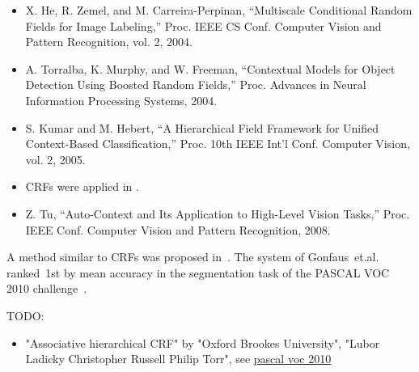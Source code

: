 \begin{itemize}
    \item X. He, R. Zemel, and M. Carreira-Perpinan, “Multiscale Conditional
          Random Fields for Image Labeling,” Proc. IEEE CS Conf. Computer
          Vision and Pattern Recognition, vol. 2, 2004.
    \item A. Torralba, K. Murphy, and W. Freeman, “Contextual Models for
          Object Detection Using Boosted Random Fields,” Proc. Advances in
          Neural Information Processing Systems, 2004.
    \item S. Kumar and M. Hebert, “A Hierarchical Field Framework for
          Unified Context-Based Classification,” Proc. 10th IEEE Int’l Conf.
          Computer Vision, vol. 2, 2005.
    \item \Glspl{CRF} were applied in \cite{shotton2006textonboost}.
    \item Z. Tu, “Auto-Context and Its Application to High-Level Vision
          Tasks,” Proc. IEEE Conf. Computer Vision and Pattern Recognition,
          2008.
\end{itemize}


A method similar to \glspl{CRF} was proposed in~\cite{gonfaus2010harmony}.
The system of Gonfaus~et.al. ranked~1st by mean accuracy in the segmentation
task of the PASCAL VOC 2010 challenge~\cite{everingham2010pascal}.

TODO:

\begin{itemize}
    \item "Associative hierarchical CRF" by "Oxford Brookes University", "Lubor Ladicky Christopher Russell Philip Torr", see \href{http://host.robots.ox.ac.uk/pascal/VOC/voc2010/results/index.html}{pascal voc 2010}
\end{itemize}